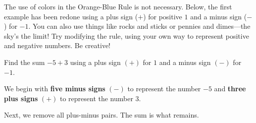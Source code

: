 \documentclass{ximera}[font=12pt]
\begin{document}
The use of colors in the Orange-Blue Rule is not necessary. Below, the first example has been redone using a plus sign ($+$) for 
positive $1$ and a minus sign ($-$) for $-1.$  You can also use things like rocks and sticks or
pennies and dimes---the sky's the limit!  Try modifying the rule, using your own way to represent positive and negative 
numbers.  Be creative!


\begin{example} 
    
    Find the sum $-5+3$ using a plus sign $(+)$ for $1$ and a minus sign $(-)$ for $-1.$
    
\begin{explanation}

    We begin with \textbf{five minus signs} $(-)$ to represent the number $-5$ and 
    \textbf{three plus signs} $(+)$ to represent the number $3.$  
    
    
\begin{center}
\end{center}

Next, we remove all plus-minus pairs.  The sum is what remains.

\begin{center}
\end{center}
\end{explanation}
\end{example}
\end{document}
